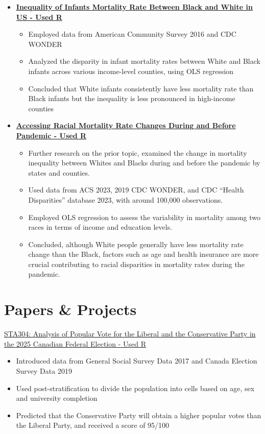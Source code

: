 \documentclass[letterpaper]{article}
\newcommand{\resumeItem}[1]{
  \renewcommand{\labelitemi}{-} %
  \item{\fontsize{12}{12}\selectfont
    {#1 \vspace{-1.5pt}}
  }
}
\newcommand{\resumeSubheadingsingle}[1]{
  \vspace{-3pt}\item
      {\fontsize{12}{12}\selectfont\textbf{#1}}\\
  \vspace{-7pt}
}
\newcommand{\resumeSubHeadingListStart}{\begin{itemize}[leftmargin=0.0in, label={}]}
\newcommand{\resumeSubHeadingListEnd}{\end{itemize}}
\newcommand{\resumeItemListStart}{\begin{itemize}}
\newcommand{\resumeItemListEnd}{\end{itemize}\vspace{-5pt}}
\begin{document}
\resumeSubHeadingListStart
\resumeSubheadingsingle
{\href{https://github.com/yiliuc/infants_mortality_inequality}{Inequality of Infants Mortality Rate Between Black and White in US - Used R}}
\resumeItemListStart
\resumeItem{Employed data from American Community Survey 2016 and CDC WONDER}
\resumeItem{Analyzed the disparity in infant mortality rates between White and Black infants across various income-level counties, using OLS regression}
\resumeItem{Concluded that White infants consistently have less mortality rate than Black infants but the inequality is less pronounced in high-income counties}
\resumeItemListEnd
\resumeSubHeadingListEnd

\resumeSubHeadingListStart
\resumeSubheadingsingle
{\href{https://github.com/yiliuc/racial_mortality_inequality_covid}{Accessing Racial Mortality Rate Changes During and Before Pandemic - Used R}}
\resumeItemListStart
\resumeItem{Further research on the prior topic, examined the change in mortality inequality between Whites and Blacks during and before the pandemic by states and counties.}
\resumeItem{Used data from ACS 2023, 2019 CDC WONDER, and CDC “Health Disparities” database 2023, with around 100,000 observations.}
\resumeItem{Employed OLS regression to assess the variability in mortality among two races in terms of income and education levels.}
\resumeItem{Concluded, although White people generally have less mortality rate change than the Black, factors such as age and health insurance are more crucial contributing to racial disparities in mortality rates during the pandemic.}
\resumeItemListEnd
\resumeSubHeadingListEnd
\vspace{-5pt}


\section{Papers \& Projects}
\resumeSubHeadingListStart
\resumeSubheadingsingle
{\href{https://github.com/yiliuc/Projects-Papers/tree/main/Popular%20Votes}{STA304: Analysis of Popular Vote for the Liberal and the Conservative Party in the 2025 Canadian Federal Election - Used R}}
\resumeItemListStart
\resumeItem{Introduced data from General Social Survey Data 2017 and Canada Election Survey Data 2019}
\resumeItem{Used post-stratification to divide the population into cells based on age, sex and university completion}
\resumeItem{Predicted that the Conservative Party will obtain a higher popular votes than the Liberal Party, and received a score of 95/100}
\resumeItemListEnd
\resumeSubHeadingListEnd
\end{document}
